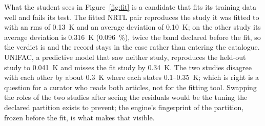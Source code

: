 \documentclass[11pt,a4paper]{article}
\newcommand{\code}[1]{\texttt{\detokenize{#1}}}
\begin{document}
What the student sees in Figure~\ref{fig:fit} is a candidate that fits its
training data well and fails its test.  The fitted NRTL pair reproduces the
study it was fitted to with an rms of 0.13~K and an average deviation of
0.10~K; on the other study its average deviation is 0.316~K (0.096~\%),
twice the band declared before the fit, so the verdict is
\code{notValidated} and the record stays in the case rather than entering
the catalogue.  UNIFAC, a predictive model that saw neither study,
reproduces the held-out study to 0.041~K and misses the fit study by
0.34~K.  The two studies disagree with each other by about 0.3~K where each
states 0.1--0.35~K; which is right is a question for a curator who reads
both articles, not for the fitting tool.  Swapping the roles of the two
studies after seeing the residuals would be the tuning the declared
partition exists to prevent; the engine's fingerprint of the partition,
frozen before the fit, is what makes that visible.
\end{document}
